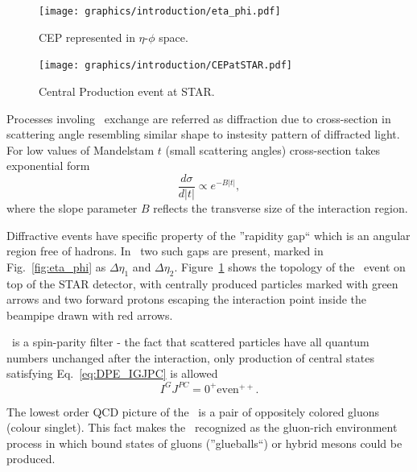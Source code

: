 \begin{figure}[b!]
\centering
\parbox{0.475\textwidth}{\vspace{-12pt}%
  \centering%
  \hspace*{-18pt}\texttt{[image: graphics/introduction/eta\_phi.pdf]}\vspace*{-15pt}%
  \caption{CEP represented in $\eta$-$\phi$ space.\\}%
  \label{fig:eta_phi}%
}
\quad\quad
\parbox{0.475\textwidth}{%
  \centering%
  \texttt{[image: graphics/introduction/CEPatSTAR.pdf]}%
  \caption{Central Production event at STAR.\\}\label{fig:CEPatSTAR}%
}%
\end{figure}

Processes involing \Pomeron\  exchange are referred as diffraction due to cross-section in scattering angle resembling similar shape to instesity pattern of diffracted light. For low values of Mandelstam $t$ (small scattering angles) cross-section takes exponential form\vspace{-2pt}
\begin{equation}
 \frac{d\sigma}{d|t|} \propto e^{-B|t|},
\end{equation}%
where the slope parameter $B$ reflects the transverse size of the interaction region.

Diffractive events have specific property of the ''rapidity gap`` which is an angular region free of hadrons. In \DPE\ two such gaps are present, marked in Fig.~\ref{fig:eta_phi} as $\Delta\eta_{1}$ and $\Delta\eta_{2}$. Figure~\ref{fig:CEPatSTAR} shows the topology of the \DPE\ event on top of the STAR detector, with centrally produced particles marked with green arrows and two forward protons escaping the interaction point inside the beampipe drawn with red arrows.%

\DPE\ is a spin-parity filter - the fact that scattered particles have all quantum numbers unchanged after the interaction, only production of central states satisfying Eq.~\eqref{eq:DPE_IGJPC} is allowed
\begin{equation}\label{eq:DPE_IGJPC}
 I^{G}J^{PC}=0^{+}\textrm{even}^{++}.
\end{equation}%

The lowest order QCD picture of the \Pomeron\ is a pair of oppositely colored gluons (colour singlet). This fact makes the \DPE\ recognized as the gluon-rich environment process in which bound states of gluons (''glueballs``) or hybrid mesons could be produced.

